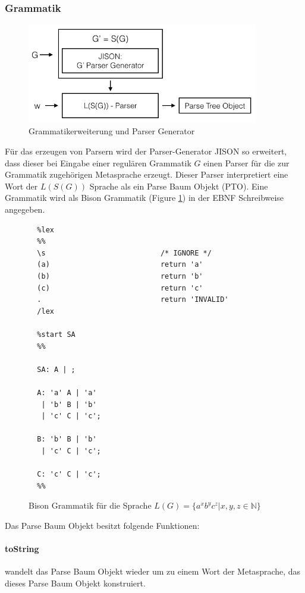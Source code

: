 \documentclass[a4paper,12pt]{report}
\begin{document}
\subsubsection*{Grammatik}
\begin{figure}[ht]
    \centering
    \includegraphics[width=0.90\textwidth]{bilder/parsergenerator.png}
    \caption{Grammatikerweiterung und Parser Generator}
\end{figure}

Für das erzeugen von Parsern wird der Parser-Generator JISON so erweitert, dass dieser bei Eingabe einer regulären Grammatik $G$ einen Parser für die zur Grammatik zugehörigen Metasprache erzeugt. Dieser Parser interpretiert eine Wort der $L(S(G))$ Sprache als ein Parse Baum Objekt (PTO). Eine Grammatik wird als Bison Grammatik (Figure \ref{bisongrammar}) in der EBNF Schreibweise angegeben.

\begin{figure}[ht]
  \centering
  \begin{lstlisting}
  %lex
  %%
  \s                           /* IGNORE */
  (a)                          return 'a'
  (b)                          return 'b'
  (c)                          return 'c'
  .                            return 'INVALID'
  /lex

  %start SA
  %% 

  SA: A | ;

  A: 'a' A | 'a'
   | 'b' B | 'b'
   | 'c' C | 'c';

  B: 'b' B | 'b'
   | 'c' C | 'c';

  C: 'c' C | 'c';
  %%
  \end{lstlisting}
  \caption{ Bison Grammatik für die Sprache $L(G) = \{ a^xb^yc^z | x,y,z\in \mathbb{N} \}$ }
  \label{bisongrammar}
\end{figure}

Das Parse Baum Objekt besitzt folgende Funktionen:

\paragraph*{toString}
wandelt das Parse Baum Objekt wieder um zu einem Wort der Metasprache, das dieses Parse Baum Objekt konstruiert.
\end{document}
